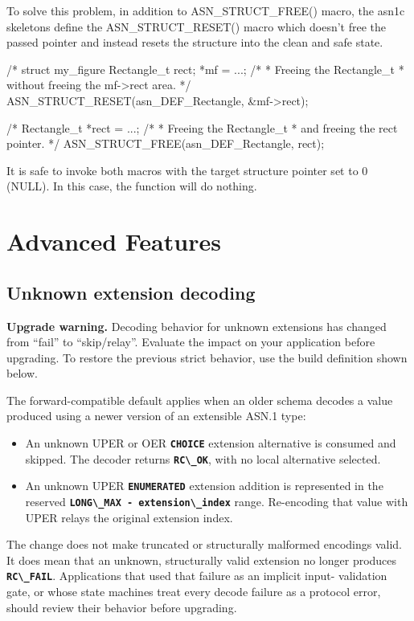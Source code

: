 \documentclass[english,oneside,12pt]{book}
\newcommand{\code}[1]{\texttt{\textbf{\lstinline{#1}}}}
\begin{document}
To solve this problem, in addition to ASN\_STRUCT\_FREE() macro, the asn1c
skeletons define the ASN\_STRUCT\_RESET() macro which doesn't free the passed
pointer and instead resets the structure into the clean and safe state.
\begin{codesample}
/* %
struct my_figure {
    Rectangle_t rect;
} *mf = ...;
/*
 * Freeing the Rectangle_t
 * without freeing the mf->rect area.
 */
ASN_STRUCT_RESET(asn_DEF_Rectangle, &mf->rect);
  
/* %
Rectangle_t *rect = ...;
/*
 * Freeing the Rectangle_t
 * and freeing the rect pointer.
 */
ASN_STRUCT_FREE(asn_DEF_Rectangle, rect);
\end{codesample}
It is safe to invoke both macros with the target structure pointer
set to 0 (NULL). In this case, the function will do nothing.

\chapter{Advanced Features}

\section{\label{sec:Unknown-Extension-Decoding}Unknown extension decoding}

\textbf{Upgrade warning.} Decoding behavior for unknown extensions has changed
from ``fail'' to ``skip/relay''. Evaluate the impact on your application before
upgrading. To restore the previous strict behavior, use the build definition
shown below.

The forward-compatible default applies when an older schema decodes a value
produced using a newer version of an extensible ASN.1 type:

\begin{itemize}
\item An unknown UPER or OER \code{CHOICE} extension alternative is consumed
and skipped. The decoder returns \code{RC\_OK}, with no local alternative
selected.
\item An unknown UPER \code{ENUMERATED} extension addition is represented in
the reserved \code{LONG\_MAX - extension\_index} range. Re-encoding that value
with UPER relays the original extension index.
\end{itemize}

The change does not make truncated or structurally malformed encodings valid.
It does mean that an unknown, structurally valid extension no longer produces
\code{RC\_FAIL}. Applications that used that failure as an implicit input-
validation gate, or whose state machines treat every decode failure as a
protocol error, should review their behavior before upgrading.
\end{document}
